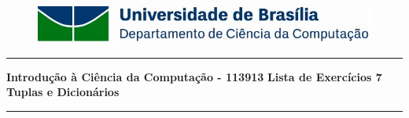 \documentclass[a4paper, 12pt]{article}
\begin{document}
\begin{figure}[htb]
	\includegraphics[scale=0.9]{UnB_CiC_Logo.jpg}
\end{figure}
\noindent\rule{\textwidth}{0.4pt}
\begin{center}
	\textbf{{\Large Introdução à Ciência da Computação - 113913}} \newline \newline
	\textbf{{\large Lista de Exercícios 7} \\
	\vspace{9pt}
	{\large Tuplas e Dicionários}} \\
	\noindent\rule{\textwidth}{0.4pt}
	\newline
\end{center}
\end{document}
